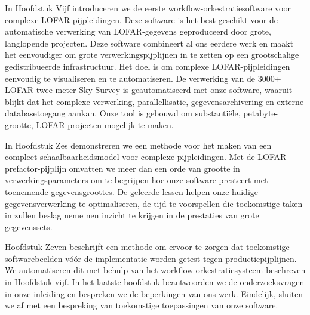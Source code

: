 In Hoofdstuk Vijf introduceren we de eerste workflow-orkestratiesoftware voor complexe LOFAR-pijpleidingen. Deze software is het best geschikt voor de automatische verwerking van LOFAR-gegevens geproduceerd door grote, langlopende projecten. Deze software combineert al ons eerdere werk en maakt het eenvoudiger om grote verwerkingspijplijnen in te zetten op een grootschalige gedistribueerde infrastructuur. Het doel is om complexe LOFAR-pijpleidingen eenvoudig te visualiseren en te automatiseren. De verwerking van de 3000+ LOFAR twee-meter Sky Survey is geautomatiseerd met onze software, waaruit blijkt dat het complexe verwerking, parallellisatie, gegevensarchivering en externe databasetoegang aankan. Onze tool is gebouwd om substantiële, petabyte-grootte, LOFAR-projecten mogelijk te maken.

In Hoofdstuk Zes demonstreren we een methode voor het maken van een compleet schaalbaarheidsmodel voor complexe pijpleidingen. Met de LOFAR-prefactor-pijplijn omvatten we meer dan een orde van grootte in verwerkingsparameters om te begrijpen hoe onze software presteert met toenemende gegevensgroottes. De geleerde lessen helpen onze huidige gegevensverwerking te optimaliseren, de tijd te voorspellen die toekomstige taken in zullen beslag neme nen inzicht te krijgen in de prestaties van grote gegevenssets.

Hoofdstuk Zeven beschrijft een methode om ervoor te zorgen dat toekomstige softwarebeelden vóór de implementatie worden getest tegen productiepijplijnen. We automatiseren dit met behulp van het workflow-orkestratiesysteem beschreven in Hoofdstuk vijf. In het laatste hoofdstuk beantwoorden we de onderzoeksvragen in onze inleiding en bespreken we de beperkingen van ons werk. Eindelijk, sluiten we af met een bespreking van toekomstige toepassingen van onze software.
